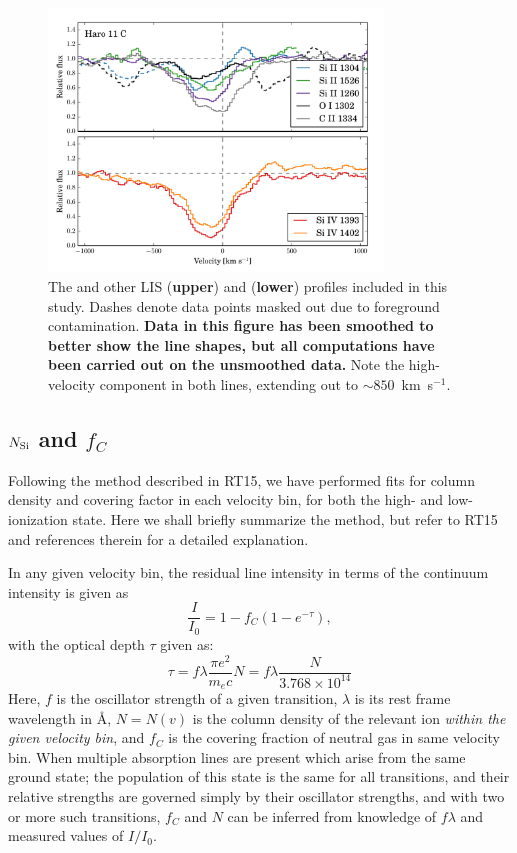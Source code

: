 \documentclass[twocolumn, trackchanges]{aastex61}
\begin{document}
\begin{figure}
\centering
\includegraphics[width=3.500in]{../Figs/HISLISProfiles.pdf}
\caption{The  and other LIS (\textbf{upper}) and 
(\textbf{lower}) profiles included in this study. Dashes denote data
points masked out due to foreground contamination. \textbf{Data in this figure has
been smoothed to better show the line shapes, but all computations have been
carried out on the unsmoothed data.} Note the
high-velocity component in both  lines, extending out to
$\sim 850$~km~s$^{-1}$.}\label{fig:SingleLines}
\end{figure}



\subsection{$N_{\rm Si}$ and $f_C$}\label{sec:aod}

Following the method described in RT15, we have performed fits for
column density and covering factor in each velocity bin, for both the
high- and low-ionization state. Here we shall briefly summarize the
method, but refer to RT15 and references therein for a detailed
explanation.

In any given velocity bin, the residual line intensity in terms of the
continuum intensity is given as
%
\begin{equation}
\label{eq:II0}
\frac{I}{I_0} = 1 - f_C (1 - e^{-\tau}),
\end{equation}
%
 with the optical depth $\tau$ given as:
%
\begin{equation}
\label{eq:tau}
\tau = f\lambda \frac{\pi e^2}{m_e c} N 
       = f\lambda \frac{N}{3.768 \times 10^{14}}
\end{equation}
%
 Here, $f$ is the oscillator strength of a given transition, $\lambda$
is its rest frame wavelength in Å, $N = N(v)$ is the column density of
the relevant ion \emph{within the given velocity bin}, and $f_{C}$ is
the covering fraction of neutral gas in same velocity bin. When multiple
absorption lines are present which arise from the same ground state; the
population of this state is the same for all transitions, and their
relative strengths are governed simply by their oscillator strengths,
and with two or more such transitions, $f_{C}$ and $N$ can be inferred
from knowledge of $f \lambda$ and measured values of $I/I_0$.
\end{document}
